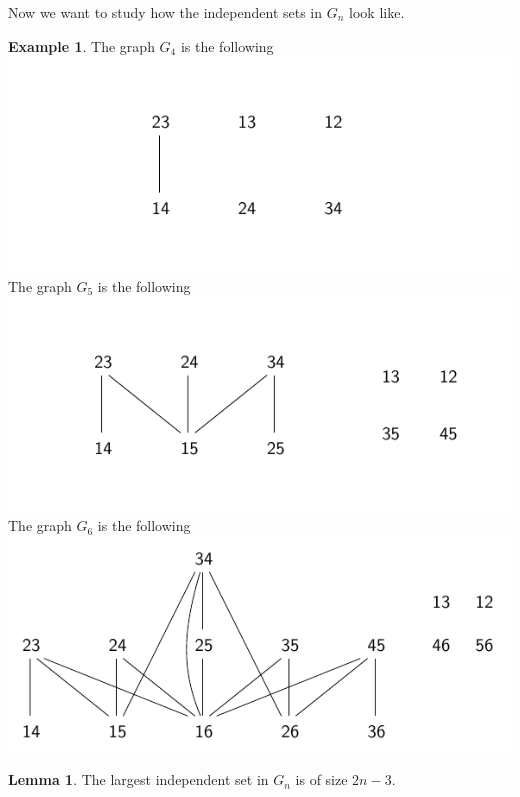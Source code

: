 \documentclass{scrartcl}
\theoremstyle{definition}
\newtheorem{lemma}[subsection]{Lemma}
\newtheorem{example}[subsection]{Example}
\begin{document}
Now we want to study how the independent sets in $G_n$ look like.
\begin{example}
    \label{ex:Gn}
    The graph $G_4$ is the following
    \\\includegraphics[width = \textwidth]{graph4.pdf}
    The graph $G_5$ is the following
    \\\includegraphics[width = \textwidth]{graph5.pdf}
    The graph $G_6$ is the following
    \\\includegraphics[width = \textwidth]{graph6.pdf}
\end{example}
\begin{lemma}
    The largest independent set in $G_n$ is of size $2n - 3$.
\end{lemma}
\end{document}
